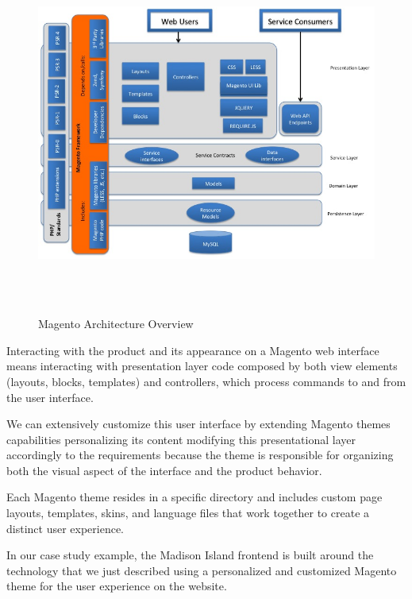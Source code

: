 \vspace{0.5cm}
\begin{figure}[H]
  \centering
    \includegraphics[height=12cm]{images/magento/magento-architecture.jpg}
  \caption{Magento Architecture Overview}
  \label{fig:magento-architecture-overview}
\end{figure}
\vspace{0.5cm}

Interacting with the product and its appearance on a Magento web interface means interacting with presentation layer code composed by both view elements (layouts, blocks, templates) and controllers, which process commands to and from the user interface. 

We can extensively customize this user interface by extending Magento themes capabilities personalizing its content modifying this presentational layer accordingly to the requirements because the theme is responsible for organizing both the visual aspect of the interface and the product behavior.

Each Magento theme resides in a specific directory and includes custom page layouts, templates, skins, and language files that work together to create a distinct user experience.

In our case study example, the Madison Island frontend is built around the technology that we just described using a personalized and customized Magento theme for the user experience on the website. 


